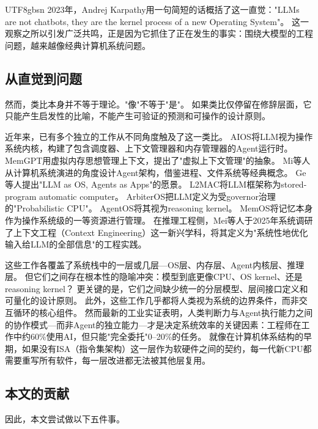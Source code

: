 \documentclass[11pt,a4paper]{article}
\begin{document}
\begin{CJK*}{UTF8}{gbsn}
2023年，Andrej Karpathy用一句简短的话概括了这一直觉："LLMs are not chatbots, they are the kernel process of a new Operating System"\cite{karpathy2023llmos}。
这一观察之所以引发广泛共鸣，正是因为它抓住了正在发生的事实：围绕大模型的工程问题，越来越像经典计算机系统问题。

\subsection{从直觉到问题}

然而，类比本身并不等于理论。"像"不等于"是"。
如果类比仅停留在修辞层面，它只能产生启发性的比喻，不能产生可验证的预测和可操作的设计原则。

近年来，已有多个独立的工作从不同角度触及了这一类比。
AIOS将LLM视为操作系统内核，构建了包含调度器、上下文管理器和内存管理器的Agent运行时\cite{mei2024aios}。
MemGPT用虚拟内存思想管理上下文，提出了"虚拟上下文管理"的抽象\cite{memgpt2023}。
Mi等人从计算机系统演进的角度设计Agent架构，借鉴进程、文件系统等经典概念\cite{mi2025llmagentscomputersystems}。
Ge等人提出"LLM as OS, Agents as Apps"的愿景\cite{ge2023llmos}。
L2MAC将LLM框架称为stored-program automatic computer\cite{holt2024l2mac}。
ArbiterOS把LLM定义为受governor治理的"Probabilistic CPU"\cite{arbiteros2025}。
AgentOS将其视为reasoning kernel\cite{agentos2025}。
MemOS将记忆本身作为操作系统级的一等资源进行管理\cite{memos2025}。
在推理工程侧，Mei等人于2025年系统调研了上下文工程（Context Engineering）这一新兴学科，将其定义为"系统性地优化输入给LLM的全部信息"的工程实践\cite{contextengineer_survey2025}。

这些工作各覆盖了系统栈中的一层或几层---OS层、内存层、Agent内核层、推理层。
但它们之间存在根本性的隐喻冲突：模型到底更像CPU、OS kernel、还是reasoning kernel？
更关键的是，它们之间缺少统一的分层模型、层间接口定义和可量化的设计原则。
此外，这些工作几乎都将人类视为系统的边界条件，而非交互循环的核心组件。
然而最新的工业实证表明，人类判断力与Agent执行能力之间的协作模式---而非Agent的独立能力---才是决定系统效率的关键因素：工程师在工作中约60\%使用AI，但只能"完全委托"0--20\%的任务\cite{anthropic2026agenticreport}。
就像在计算机体系结构的早期，如果没有ISA（指令集架构）这一层作为软硬件之间的契约，每一代新CPU都需要重写所有软件，每一层改进都无法被其他层复用。

\subsection{本文的贡献}

因此，本文尝试做以下五件事。


\end{CJK*}
\end{document}
